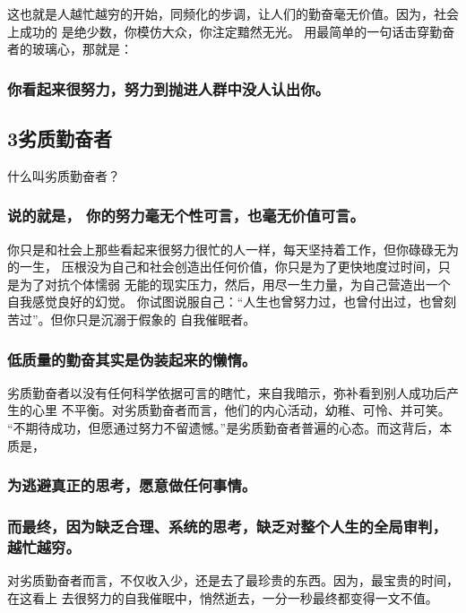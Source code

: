 \documentclass[11pt]{ctexart}
\begin{document}
{{{{这也就是人越忙越穷的开始，同频化的步调，让人们的勤奋毫无价值。因为，社会上成功的
是绝少数，你模仿大众，你注定黯然无光。
用最简单的一句话击穿勤奋者的玻璃心，那就是：
\subsubsection{你看起来很努力，努力到抛进人群中没人认出你。}
\label{sec:org2b85958}

\subsection{3劣质勤奋者}
\label{sec:org7aa444c}

什么叫劣质勤奋者？

\subsubsection{说的就是， 你的努力毫无个性可言，也毫无价值可言。}
\label{sec:org9fa4c91}

你只是和社会上那些看起来很努力很忙的人一样，每天坚持着工作，但你碌碌无为的一生，
压根没为自己和社会创造出任何价值，你只是为了更快地度过时间，只是为了对抗个体懦弱
无能的现实压力，然后，用尽一生力量，为自己营造出一个自我感觉良好的幻觉。
你试图说服自己：“人生也曾努力过，也曾付出过，也曾刻苦过”。但你只是沉溺于假象的
自我催眠者。

\subsubsection{低质量的勤奋其实是伪装起来的懒惰。}
\label{sec:org4f89af5}
劣质勤奋者以没有任何科学依据可言的瞎忙，来自我暗示，弥补看到别人成功后产生的心里
不平衡。对劣质勤奋者而言，他们的内心活动，幼稚、可怜、并可笑。
“不期待成功，但愿通过努力不留遗憾。”是劣质勤奋者普遍的心态。而这背后，本质是，
\subsubsection{为逃避真正的思考，愿意做任何事情。}
\label{sec:org36bc26f}
\subsubsection{而最终，因为缺乏合理、系统的思考，缺乏对整个人生的全局审判，越忙越穷。}
\label{sec:org0562e98}

对劣质勤奋者而言，不仅收入少，还是去了最珍贵的东西。因为，最宝贵的时间，在这看上
去很努力的自我催眠中，悄然逝去，一分一秒最终都变得一文不值。

}}}}
\end{document}
